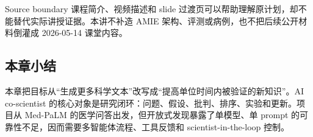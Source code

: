 \begin{warningbox}{Source boundary}
课程简介、视频描述和 slide 过渡页可以帮助理解原计划，却不能替代实际讲授证据。本讲不补造 AMIE 架构、评测或病例，也不把后续公开材料倒灌成 2026-05-14 课堂内容。
\end{warningbox}

\subsection{本章小结}

本章把目标从“生成更多科学文本”改写成“提高单位时间内被验证的新知识”。AI co-scientist 的核心对象是研究闭环：问题、假设、批判、排序、实验和更新。项目从 Med-PaLM 的医学问答出发，但开放式发现暴露了单模型、单 prompt 的可靠性不足，因而需要多智能体流程、工具反馈和 scientist-in-the-loop 控制。

